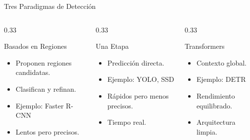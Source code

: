 \documentclass[aspectratio=169, 10pt]{beamer}
\begin{document}
\begin{frame}{Tres Paradigmas de Detecci\'on}

	\begin{columns}[T]
		\begin{column}{0.33\textwidth}
			\begin{block}{Basados en Regiones}
				\small
				\begin{itemize}
					\item Proponen regiones candidatas.
					\item Clasifican y refinan.
					\item Ejemplo: Faster R-CNN
					\item Lentos pero precisos.
				\end{itemize}
			\end{block}
		\end{column}

		\begin{column}{0.33\textwidth}
			\begin{block}{Una Etapa}
				\small
				\begin{itemize}
					\item Predicci\'on directa.
					\item Ejemplo: YOLO, SSD
					\item R\'apidos pero menos precisos.
					\item Tiempo real.
				\end{itemize}
			\end{block}
		\end{column}

		\begin{column}{0.33\textwidth}
			\begin{block}{Transformers}
				\small
				\begin{itemize}
					\item Contexto global.
					\item Ejemplo: DETR
					\item Rendimiento equilibrado.
					\item Arquitectura limpia.
				\end{itemize}
			\end{block}
		\end{column}
	\end{columns}

\end{frame}
\end{document}
